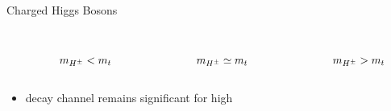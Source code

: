 \documentclass[aspectratio=169,xcolor=table]{beamer}
\begin{document}
\begin{frame}[t]{Charged Higgs Bosons}
\begin{columns}
\begin{itemize}
\begin{columns}
\begin{figure}
              \caption{$m_{H^{\pm}} < m_{t}$}
            \end{figure}
            \begin{figure}
              \tiny
              \caption{$m_{H^{\pm}} \simeq m_{t}$}
            \end{figure}
            \begin{figure}
              \tiny
              \caption{$m_{H^{\pm}} > m_{t}$}
            \end{figure}
        \end{columns}
        \item \HpmLong decay channel remains significant for high \tanb

\end{itemize}
\end{columns}
\end{frame}
\end{document}
